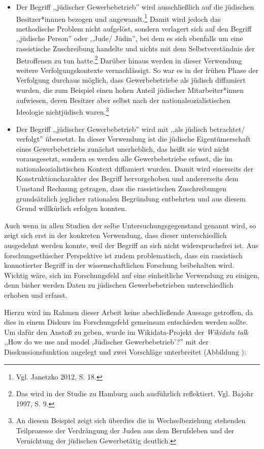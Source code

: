 \begin{itemize}
    \item Der Begriff ,,jüdischer Gewerbebetrieb'' wird ausschließlich auf die jüdischen Besitzer*innnen bezogen und angewandt.\footnote{Vgl. Janetzko 2012, S. 18.} Damit wird jedoch das methodische Problem nicht aufgelöst, sondern verlagert sich auf den Begriff ,,jüdische Person'' oder ,,Jude/ Jüdin'', bei dem es sich ebenfalls um eine rassistische Zuschreibung handelte und nichts mit dem Selbstverständnis der Betroffenen zu tun hatte.\footnote{Das wird in der Studie zu Hamburg auch ausführlich reflektiert. Vgl. Bajohr 1997, S. 9.} Darüber hinaus werden in dieser Verwendung weitere Verfolgungskontexte vernachlässigt. So war es in der frühen Phase der Verfolgung durchaus möglich, dass Gewerbebetriebe als jüdisch diffamiert wurden, die zum Beispiel einen hohen Anteil jüdischer Mitarbeiter*innen aufwiesen, deren Besitzer aber selbst nach der nationalsozialistischen Ideologie nichtjüdisch waren.\footnote{An diesem Beispiel zeigt sich überdies die in Wechselbeziehung stehenden Teilprozesse der Verdrängung der Juden aus dem Berufsleben und der Vernichtung der jüdischen Gewerbetätig deutlich.}
    \item Der Begriff ,,jüdischer Gewerbebetrieb'' wird mit ,,als jüdisch betrachtet/ verfolgt'' übersetzt. In dieser Verwendung ist die jüdische Eigentümerschaft eines Gewerbebetriebs zunächst unerheblich, das heißt sie wird nicht vorausgesetzt, sondern es werden alle Gewerbebetriebe erfasst, die im nationalsozialistischen Kontext diffamiert wurden. Damit wird einerseits der Konstruktioncharakter des Begriff hervorgehoben und andererseits dem Umstand Rechnung getragen, dass die rassistischen Zuschreibungen grundsätzlich jeglicher rationalen Begründung entbehrten und aus diesem Grund willkürlich erfolgen konnten.
\end{itemize}

Auch wenn in allen Studien der selbe Untersuchungsgegenstand genannt wird, so zeigt sich erst in der konkreten Verwendung, dass dieser unterschiedlich ausgedehnt werden konnte, weil der Begriff an sich nicht widerspruchsfrei ist. Aus forschungsethischer Perspektive ist zudem problematisch, dass ein rassistisch konnotierter Begriff in der wissenschaftlichen Forschung beibehalten wird. Wichtig wäre, sich im Forschungsfeld auf eine einheitliche Verwendung zu einigen, denn bisher werden Daten zu jüdischen Gewerbebetrieben unterschiedlich erhoben und erfasst. 

Hierzu wird im Rahmen dieser Arbeit keine abschließende Aussage getroffen, da dies in einem Diskurs im Forschungsfeld gemeinsam entschieden werden sollte. Um dafür den Anstoß zu geben, wurde im Wikidata-Projekt der \textit{Wikidata talk} ,,How do we use and model ,Jüdischer Gewerbebetrieb'?'' mit der Disskussionsfunktion angelegt und zwei Vorschläge unterbreitet (Abbildung ): 

